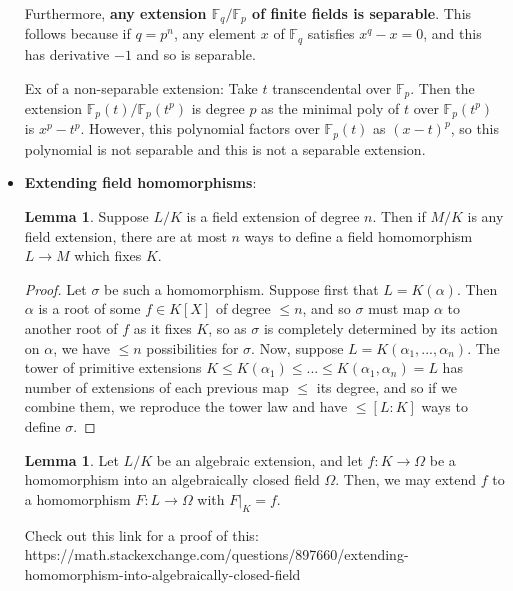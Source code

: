 \documentclass[11pt, oneside]{amsart}   	%
\theoremstyle{definition}
\newtheorem{lemma}[theorem]{Lemma}
\begin{document}
\begin{itemize}
	Furthermore, \textbf{any extension $\mathbb F_q / \mathbb F_p$ of finite fields is separable}. This follows because if $q = p^n$, any element $x$ of 
	$\mathbb F_q$ satisfies $x^q - x = 0$, and this has derivative $-1$ and so is separable.
	
	Ex of a non-separable extension: Take $t$ transcendental over $\mathbb F_p$. Then the extension $\mathbb F_p(t) / \mathbb F_p(t^p)$ is degree 
	$p$ as the minimal poly of $t$ over $\mathbb F_p(t^p)$ is $x^p - t^p$. However, this polynomial factors over $\mathbb F_p(t)$ as $(x - t)^p$, so 
	this polynomial is not separable and this is not a separable extension.
	
	\item \textbf{Extending field homomorphisms}: 
	
	\begin{lemma} 
		Suppose $L / K$ is a field extension of degree $n$. Then if $M / K$ is any field extension, there are at most $n$ ways to define a field 
		homomorphism $L\rightarrow M$ which fixes $K$. 
	\end{lemma}
	
	\begin{proof}
	
		Let $\sigma$ be such a homomorphism. Suppose first that $L = K(\alpha)$. Then $\alpha$ is a root of some $f\in K[X]$ of degree $\leq n$, and so
		$\sigma$ must map $\alpha$ to another root of $f$ as it fixes $K$, so as $\sigma$ is completely determined by its action on $\alpha$, we 
		have $\leq n$ possibilities for $\sigma$. Now, suppose $L = K(\alpha_1, ..., \alpha_n)$. The tower of primitive extensions $K\leq K(\alpha_1)\leq ... 
		\leq K(\alpha_1, \alpha_n) = L$ has number of extensions of each previous map $\leq$ its degree, and so if we combine them, we reproduce the 
		tower law and have $\leq [L : K]$ ways to define $\sigma$.
	
	\end{proof}
	
	\begin{lemma} Let $L / K$ be an algebraic extension, and let $f : K\rightarrow \Omega$ be a homomorphism into an algebraically closed field 
	$\Omega$. Then, we may extend $f$ to a homomorphism $F : L\rightarrow \Omega$ with $F|_K = f$. \end{lemma}
	
	Check out this link for a proof of this: https://math.stackexchange.com/questions/897660/extending-homomorphism-into-algebraically-closed-field


\end{itemize}
\end{document}
